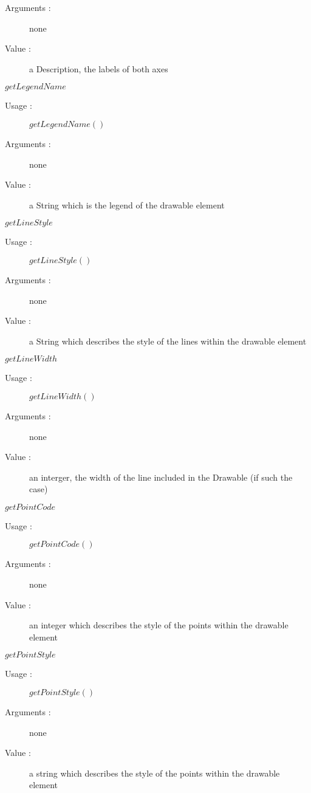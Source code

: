 \begin{description}
\begin{description}
\begin{description}
    \item[Arguments :] none
    \item[Value :] a Description, the labels of both axes
    \end{description}
    \bigskip
  \item $getLegendName$
    \begin{description}
    \item[Usage :] $getLegendName()$
    \item[Arguments :] none
    \item[Value :] a String which is the legend of the drawable element
    \end{description}
    \bigskip
  \item $getLineStyle$
    \begin{description}
    \item[Usage :] $getLineStyle()$
    \item[Arguments :] none
    \item[Value :] a String which describes the  style of the lines within the drawable element
    \end{description}
    \bigskip
  \item $getLineWidth$
    \begin{description}
    \item[Usage :] $getLineWidth()$
    \item[Arguments :] none
    \item[Value :] an interger, the width of the line included in the Drawable (if such the case)
    \end{description}
    \bigskip
  \item $getPointCode$
    \begin{description}
    \item[Usage :] $getPointCode()$
    \item[Arguments :] none
    \item[Value :] an integer which describes the style of the points within the drawable element
    \end{description}
    \bigskip
  \item $getPointStyle$
    \begin{description}
    \item[Usage :] $getPointStyle()$
    \item[Arguments :] none
    \item[Value :] a string which describes the style of the points within the drawable element
    \end{description}

\end{description}
\end{description}
